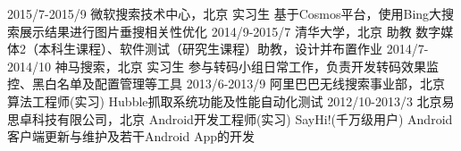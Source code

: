 \documentclass[]{friggeri-cv-cn}
\begin{document}
\begin{entrylist}
  \entry
    {2015/7-2015/9}
    {微软搜索技术中心，北京}
    {实习生}
    {基于Cosmos平台，使用Bing大搜索展示结果进行图片垂搜相关性优化}
  \entry
    {2014/9-2015/7}
    {清华大学，北京}
    {助教}
    {数字媒体2（本科生课程）、软件测试（研究生课程）助教，设计并布置作业}
  \entry
    {2014/7-2014/10}
    {神马搜索，北京}
    {实习生}
    {参与转码小组日常工作，负责开发转码效果监控、黑白名单及配置管理等工具}
  \entry
    {2013/6-2013/9}
    {阿里巴巴无线搜索事业部，北京}
    {算法工程师(实习)}
    {Hubble抓取系统功能及性能自动化测试}
  \entry
    {2012/10-2013/3}
    {北京易思卓科技有限公司，北京}
    {Android开发工程师(实习)}
    {SayHi!(千万级用户) Android客户端更新与维护及若干Android App的开发}
\end{entrylist}
\end{document}
